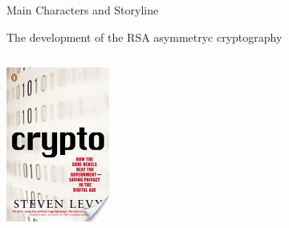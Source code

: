\begin{frame}[t,fragile]{Main Characters and Storyline}
\begin{block}{The development of the RSA asymmetryc cryptography}
{\begin{columns}
\begin{center}
        \includegraphics[angle=0,width=0.95\linewidth]{./Figs/content.jpeg}%
      \end{center}
    \end{columns}
      
    }
  \end{block}
  
\end{frame}
